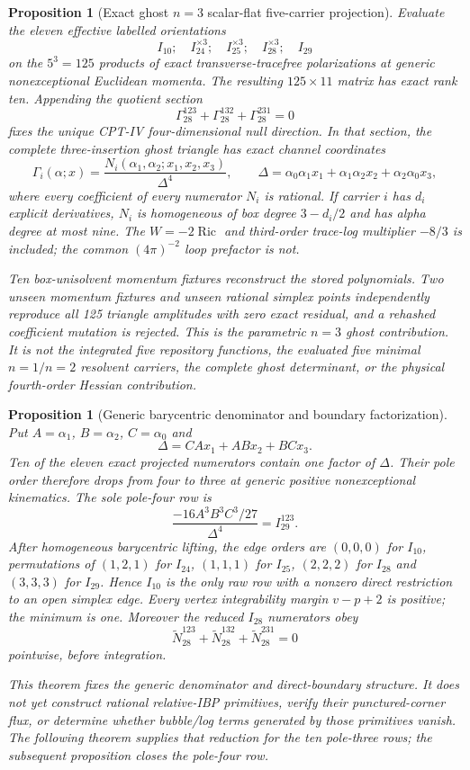 \documentclass[11pt]{article}
\newtheorem{proposition}[theorem]{Proposition}
\theoremstyle{definition}
\theoremstyle{remark}
\begin{document}
\begin{proposition}[Exact ghost $n=3$ scalar-flat five-carrier projection]
Evaluate the eleven effective labelled orientations
\[
 I_{10};\quad I_{24}^{\times3};\quad I_{25}^{\times3};\quad
 I_{28}^{\times3};\quad I_{29}
\]
on the $5^3=125$ products of exact transverse-tracefree polarizations at
generic nonexceptional Euclidean momenta.  The resulting $125\times11$
matrix has exact rank ten.  Appending the quotient section
\[
 \Gamma_{28}^{123}+\Gamma_{28}^{132}+\Gamma_{28}^{231}=0
\]
fixes the unique CPT-IV four-dimensional null direction.  In that section,
the complete three-insertion ghost triangle has exact channel coordinates
\[
 \Gamma_i(\alpha;x)=
 \frac{N_i(\alpha_1,\alpha_2;x_1,x_2,x_3)}{\Delta^4},
 \qquad
 \Delta=\alpha_0\alpha_1x_1+
 \alpha_1\alpha_2x_2+
 \alpha_2\alpha_0x_3,
\]
where every coefficient of every numerator $N_i$ is rational.  If carrier
$i$ has $d_i$ explicit derivatives, $N_i$ is homogeneous of box degree
$3-d_i/2$ and has alpha degree at most nine.  The $W=-2\operatorname{Ric}$
and third-order trace-log multiplier $-8/3$ is included; the common
$(4\pi)^{-2}$ loop prefactor is not.

Ten box-unisolvent momentum fixtures reconstruct the stored polynomials.
Two unseen momentum fixtures and unseen rational simplex points independently
reproduce all 125 triangle amplitudes with zero exact residual, and a
rehashed coefficient mutation is rejected.  This is the parametric $n=3$
ghost contribution.  It is not the integrated five repository functions,
the evaluated five minimal $n=1/n=2$ resolvent carriers, the complete ghost determinant, or
the physical fourth-order Hessian contribution.
\end{proposition}

\begin{proposition}[Generic barycentric denominator and boundary factorization]
Put $A=\alpha_1$, $B=\alpha_2$, $C=\alpha_0$ and
\[
 \Delta=CAx_1+ABx_2+BCx_3.
\]
Ten of the eleven exact projected numerators contain one factor of $\Delta$.
Their pole order therefore drops from four to three at generic positive
nonexceptional kinematics.  The sole pole-four row is
\[
 \frac{-16A^3B^3C^3/27}{\Delta^4}=I_{29}^{123}.
\]
After homogeneous barycentric lifting, the edge orders are $(0,0,0)$ for
$I_{10}$, permutations of $(1,2,1)$ for $I_{24}$, $(1,1,1)$ for $I_{25}$,
$(2,2,2)$ for $I_{28}$ and $(3,3,3)$ for $I_{29}$.  Hence $I_{10}$ is the
only raw row with a nonzero direct restriction to an open simplex edge.
Every vertex integrability margin $v-p+2$ is positive; the minimum is one.
Moreover the reduced $I_{28}$ numerators obey
\[
 \widetilde N_{28}^{123}
 +\widetilde N_{28}^{132}
 +\widetilde N_{28}^{231}=0
\]
pointwise, before integration.

This theorem fixes the generic denominator and direct-boundary structure.  It
does not yet construct rational relative-IBP primitives, verify their
punctured-corner flux, or determine whether bubble/log terms generated by
those primitives vanish.  The following theorem supplies that reduction for
the ten pole-three rows; the subsequent proposition closes the pole-four row.
\end{proposition}
\end{document}
